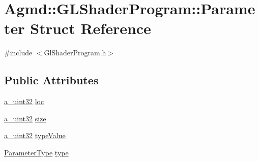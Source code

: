 \hypertarget{struct_agmd_1_1_g_l_shader_program_1_1_parameter}{\section{Agmd\+:\+:G\+L\+Shader\+Program\+:\+:Parameter Struct Reference}
\label{struct_agmd_1_1_g_l_shader_program_1_1_parameter}
}


{\ttfamily \#include $<$Gl\+Shader\+Program.\+h$>$}

\subsection*{Public Attributes}
\begin{DoxyCompactItemize}
\item 
\hyperlink{_common_defines_8h_a964296f9770051b9e4807b1f180dd416}{a\+\_\+uint32} \hyperlink{struct_agmd_1_1_g_l_shader_program_1_1_parameter_ab6822576267384e3c183dd93fceec9fd}{loc}
\item 
\hyperlink{_common_defines_8h_a964296f9770051b9e4807b1f180dd416}{a\+\_\+uint32} \hyperlink{struct_agmd_1_1_g_l_shader_program_1_1_parameter_acc0db24dc0df7fd90128ca251f89a26d}{size}
\item 
\hyperlink{_common_defines_8h_a964296f9770051b9e4807b1f180dd416}{a\+\_\+uint32} \hyperlink{struct_agmd_1_1_g_l_shader_program_1_1_parameter_a9453ce46a8627caf9f3cae2cf72f0836}{type\+Value}
\item 
\hyperlink{class_agmd_1_1_g_l_shader_program_ad3ee475a349c91e74f4c498c69e9d84a}{Parameter\+Type} \hyperlink{struct_agmd_1_1_g_l_shader_program_1_1_parameter_a02afcff2c6ba67f904b190fe2e0f761d}{type}
\end{DoxyCompactItemize}


